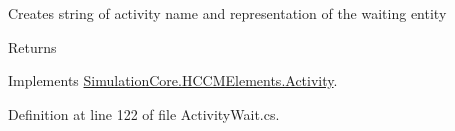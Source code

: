 Creates string of activity name and representation of the waiting entity 

\begin{DoxyReturn}{Returns}

\end{DoxyReturn}


Implements \hyperlink{class_simulation_core_1_1_h_c_c_m_elements_1_1_activity_a352124cf18f8505e51c8847a71769f7d}{Simulation\+Core.\+H\+C\+C\+M\+Elements.\+Activity}.



Definition at line 122 of file Activity\+Wait.\+cs.

